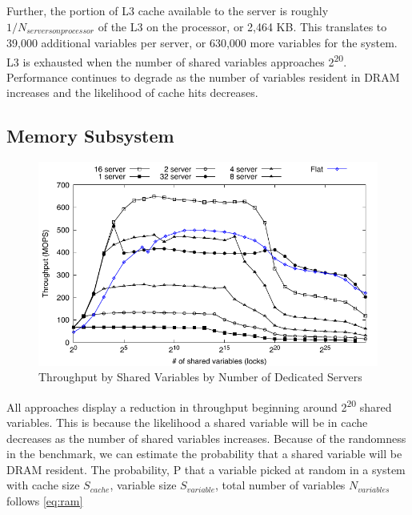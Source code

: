 \documentclass{uicthesi}
\begin{document}
Further, the portion of L3 cache available to the server is roughly $1 / N_{servers on processor}$ of the L3 on the processor, or 2,464 KB. This translates to 39,000 additional variables per server, or 630,000 more variables for the system. L3 is exhausted when the number of shared variables approaches 2\textsuperscript{20}. Performance continues to degrade as the number of variables resident in DRAM increases and the likelihood of cache hits decreases. 


\subsection{Memory Subsystem}

\begin{figure}[ht!]
\centering
\includegraphics[width=0.9\columnwidth]{FIG/fetch_add_dedicated_vary_server.pdf}
\caption{Throughput by Shared Variables by Number of Dedicated Servers}
\label{fig:vary_server}
\end{figure}

All approaches display a reduction in throughput beginning around 2\textsuperscript{20} shared variables. This is because the likelihood a shared variable will be in cache decreases as the number of shared variables increases. Because of the randomness in the benchmark, we can estimate the probability that a shared variable will be DRAM resident. The probability, P  that a variable picked at random in a system with cache size $S_{cache}$, variable size $S_{variable}$, total number of variables $N_{variables}$ follows \ref{eq:ram}
\end{document}
